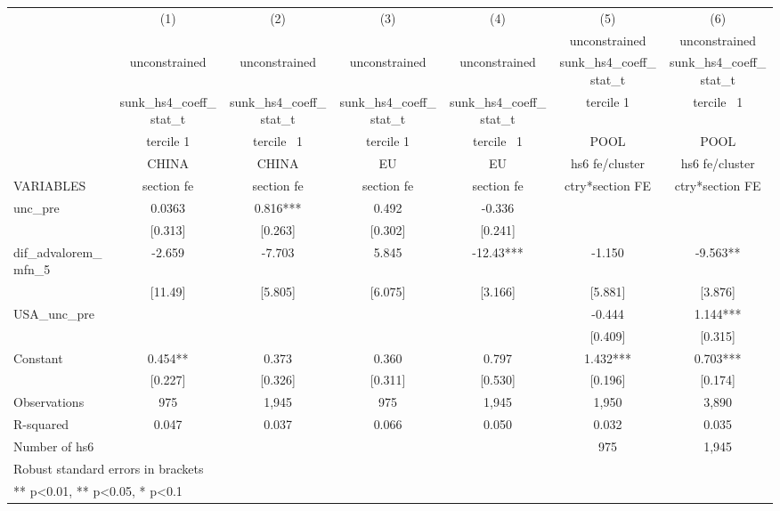 \begin{adjustbox}{max width=\textwidth}
\begin{tabular}{lcccccc}
\toprule
 & (1) & (2) & (3) & (4) & (5) & (6) \\
 &  &  &  &  & unconstrained & unconstrained \\
 & unconstrained & unconstrained & unconstrained & unconstrained & sunk\_hs4\_coeff\_stat\_t & sunk\_hs4\_coeff\_stat\_t \\
 & sunk\_hs4\_coeff\_stat\_t & sunk\_hs4\_coeff\_stat\_t & sunk\_hs4\_coeff\_stat\_t & sunk\_hs4\_coeff\_stat\_t & tercile 1 & tercile~ 1 \\
 & tercile 1 & tercile~ 1 & tercile 1 & tercile~ 1 & POOL & POOL \\
 & CHINA & CHINA & EU & EU & hs6 fe/cluster & hs6 fe/cluster \\
VARIABLES & section fe & section fe & section fe & section fe & ctry*section FE & ctry*section FE \\
\midrule
unc\_pre & 0.0363 & 0.816*** & 0.492 & -0.336 &  &  \\
 & [0.313] & [0.263] & [0.302] & [0.241] &  &  \\
dif\_advalorem\_mfn\_5 & -2.659 & -7.703 & 5.845 & -12.43*** & -1.150 & -9.563** \\
 & [11.49] & [5.805] & [6.075] & [3.166] & [5.881] & [3.876] \\
USA\_unc\_pre &  &  &  &  & -0.444 & 1.144*** \\
 &  &  &  &  & [0.409] & [0.315] \\
Constant & 0.454** & 0.373 & 0.360 & 0.797 & 1.432*** & 0.703*** \\
 & [0.227] & [0.326] & [0.311] & [0.530] & [0.196] & [0.174] \\
\midrule
Observations & 975 & 1,945 & 975 & 1,945 & 1,950 & 3,890 \\
R-squared & 0.047 & 0.037 & 0.066 & 0.050 & 0.032 & 0.035 \\
Number of hs6 &  &  &  &  & 975 & 1,945 \\
\bottomrule
\multicolumn{7}{l}{\footnotesize Robust standard errors in brackets} \\
\multicolumn{7}{l}{\footnotesize *** p<0.01, ** p<0.05, * p<0.1} \\
\end{tabular}
\end{adjustbox}
